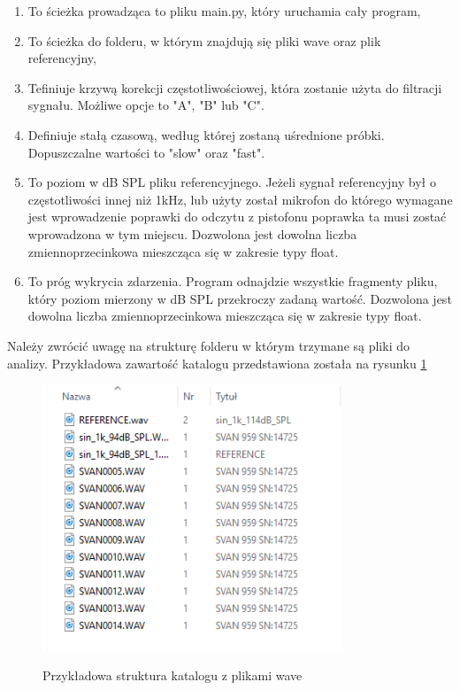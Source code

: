 \documentclass[eng,printmode]{mgr}
\begin{document}
\begin{minipage}{\linewidth}
\begin{enumerate}
\item To ścieżka prowadząca to pliku main.py, który uruchamia cały program,
\item To ścieżka do folderu, w którym znajdują się pliki wave oraz plik referencyjny,
\item Tefiniuje krzywą korekcji częstotliwościowej, która zostanie użyta do filtracji sygnału. Możliwe opcje to "A", "B" lub "C".
\item Definiuje stałą czasową, według której zostaną uśrednione próbki. Dopuszczalne wartości to "slow" oraz "fast".
\item To poziom w dB SPL pliku referencyjnego. Jeżeli sygnał referencyjny był o częstotliwości innej niż 1kHz, lub użyty został mikrofon do którego wymagane jest wprowadzenie poprawki do odczytu z pistofonu poprawka ta musi zostać wprowadzona w tym miejscu. Dozwolona jest dowolna liczba zmiennoprzecinkowa mieszcząca się w zakresie typy float.
\item To próg wykrycia zdarzenia. Program odnajdzie wszystkie fragmenty pliku, który poziom mierzony w dB SPL przekroczy zadaną wartość. Dozwolona jest dowolna liczba zmiennoprzecinkowa mieszcząca się w zakresie typy float.
\end{enumerate}
\end{minipage}   

Należy zwrócić uwagę na strukturę folderu w którym trzymane są pliki do analizy. Przykładowa zawartość katalogu przedstawiona została na rysunku \ref{katalog}

\begin{figure}[hbtp]
\caption{Przykładowa struktura katalogu z plikami wave}
\centering
\includegraphics[width=0.8\textwidth]{katalog_przyklad.PNG}
\label{katalog}
\end{figure}
\end{document}
